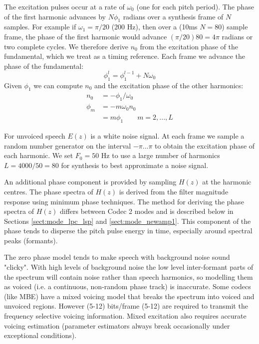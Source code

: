 \documentclass{article}
\begin{document}
The excitation pulses occur at a rate of $\omega_0$ (one for each pitch period). The phase of the first harmonic advances by $N \phi_1$ radians over a synthesis frame of $N$ samples.  For example if $\omega_1 = \pi /20$ (200 Hz), then over a (10ms $N=80$) sample frame, the phase of the first harmonic would advance $(\pi/20)80 = 4 \pi$ radians or two complete cycles. We therefore derive $n_0$ from the excitation phase of the fundamental, which we treat as a timing reference.  Each frame we advance the phase of the fundamental:
\begin{equation}
\phi_1^l = \phi_1^{l-1} + N\omega_0
\end{equation}
Given $\phi_1$ we can compute $n_0$ and the excitation phase of the other harmonics:
\begin{equation}
\begin{split}
n_0    &= -\phi_1 / \omega_0 \\
\phi_m &= - m \omega_0 n_0 \\
       &= m \phi_1 \quad \quad m=2,...,L
\end{split}
\end{equation}

For unvoiced speech $E(z)$ is a white noise signal.  At each frame we sample a random number generator on the interval $-\pi ... \pi$ to obtain the excitation phase of each harmonic.  We set $F_0 = 50$ Hz to use a large number of harmonics $L=4000/50=80$ for synthesis to best approximate a noise signal.

An additional phase component is provided by sampling $H(z)$ at the harmonic centres.  The phase spectra of $H(z)$ is derived from the filter magnitude response using minimum phase techniques.  The method for deriving the phase spectra of $H(z)$ differs between Codec 2 modes and is described below in Sections \ref{sect:mode_lpc_lsp} and \ref{sect:mode_newamp1}.  This component of the phase tends to disperse the pitch pulse energy in time, especially around spectral peaks (formants).

The zero phase model tends to make speech with background noise sound "clicky".  With high levels of background noise the low level inter-formant parts of the spectrum will contain noise rather than speech harmonics, so modelling them as voiced (i.e. a continuous, non-random phase track) is inaccurate. Some codecs (like MBE) have a mixed voicing model that breaks the spectrum into voiced and unvoiced regions.  However (5-12) bits/frame (5-12) are required to transmit the frequency selective voicing information.  Mixed excitation also requires accurate voicing estimation (parameter estimators always break occasionally under exceptional conditions).
\end{document}
